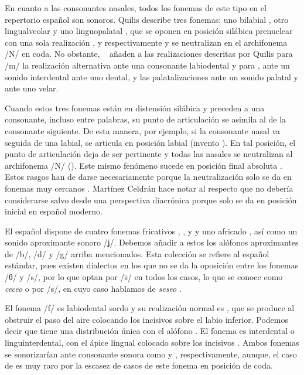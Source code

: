 En cuanto a las consonantes nasales, todos los fonemas de este tipo en el repertorio español son sonoros. Quilis describe tres fonemas: uno bilabial , otro lingualveolar  y uno linguopalatal , que se oponen en posición silábica  prenuclear con una sola realización \ipa{[m]}, \ipa{[n]} y \ipa{[ɲ]} respectivamente \parencite[225]{quilis2019} y se neutralizan en el archifonema /N/ en coda. No obstante, \citeauthor{clegg2018}~\parencite*[331-337]{clegg2018} añaden a las realizaciones descritas por Quilis para /m/ la realización alternativa \ipa{[ɱ]} ante una consonante labiodental y para , \ipa{[n̠]} ante un sonido interdental \ipa{[n̪]} ante uno dental, y las palatalizaciones \ipa{[n̠]} ante un sonido palatal y \ipa{[ŋ]} ante uno velar.



Cuando estos tres fonemas están en distensión silábica y preceden a una consonante, incluso entre palabras, su punto de articulación se asimila al de la consonante siguiente. De esta manera, por ejemplo, si la consonante nasal va seguida de una labial, se articula en posición labial (\textlangle{}invento\textrangle{}  \ipa{[imˈbento]}). En tal posición, el punto de articulación deja de ser pertinente y todas las nasales se neutralizan al archifonema /N/ (). Este mismo fenómeno sucede en posición final absoluta \parencite[180-182]{alarcos1964}. Estos rasgos han de darse necesariamente porque la neutralización solo se da en fonemas muy cercanos \parencite[228-231]{quilis2019}. Martínez Celdrán \parencite*[51]{martinezceldran2004} hace notar al respecto que  no debería considerarse salvo desde una perspectiva diacrónica porque solo se da en posición inicial en español moderno.

El español dispone de cuatro fonemas fricativos , ,  y  y uno africado , así como un sonido aproximante sonoro /ʝ/. Debemos añadir a estos los alófonos aproximantes de /b/, /d/ y /g/ arriba mencionados. Esta colección se refiere al español estándar, pues existen dialectos en los que no se da la oposición entre los fonemas /θ/ y /s/, por lo que optan por /s̄/ en todos los casos, lo que se conoce como \textit{ceceo} o por /s/, en cuyo caso hablamos de \textit{seseo} \parencite[286]{clegg2018}.

El fonema /f/ es labiodental sordo y su realización normal es \ipa{[f]}, que se produce al obstruir el paso del aire colocando los incisivos sobre el labio inferior. Podemos decir que tiene una distribución única con el alófono \ipa{[f]} \parencite[246]{quilis2019}. El fonema   es interdental o linguinterdental, con el ápice lingual colocado sobre los incisivos \parencite[247]{quilis2019}. Ambos fonemas se sonorizarían ante consonante sonora como \ipa{[v]} y \ipa{[ð]}, respectivamente, aunque, el caso de  es muy raro por la escasez de casos de este fonema en posición de coda.

